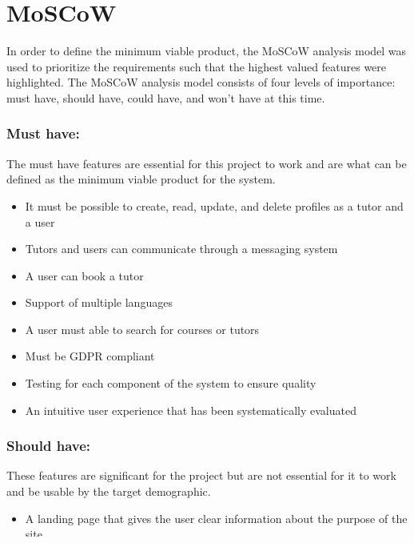 \section{MoSCoW}\label{sec:moscow}
In order to define the minimum viable product, the MoSCoW analysis model was used to prioritize the requirements such that the highest valued features were highlighted.
The MoSCoW analysis model consists of four levels of importance: must have, should have, could have, and won't have at this time.

\subsubsection{Must have:}
The must have features are essential for this project to work and are what can be defined as the minimum viable product for the system.

\begin{itemize}
    \item It must be possible to create, read, update, and delete profiles as a tutor and a user
    \item Tutors and users can communicate through a messaging system
    \item A user can book a tutor
    \item Support of multiple languages
    \item A user must able to search for courses or tutors
    \item Must be GDPR compliant
    \item Testing for each component of the system to ensure quality
    \item An intuitive user experience that has been systematically evaluated
\end{itemize}

\subsubsection{Should have:}
These features are significant for the project but are not essential for it to work and be usable by the target demographic.

\begin{itemize}
    \item A landing page that gives the user clear information about the purpose of the site
    \item A tutor should be able to upload material and grant access to materials to certain users
    \item It should be possible to view materials
    \item A user should be able to rate and write reviews of a tutor's courses
    \item There should be an administration dashboard for administrators to delete or ban users and tutors
    \item A user should be able to see courses that he has participated in before
    \item The site should work on both mobile and web
    \item Each service must belong to one or more categories
\end{itemize}

